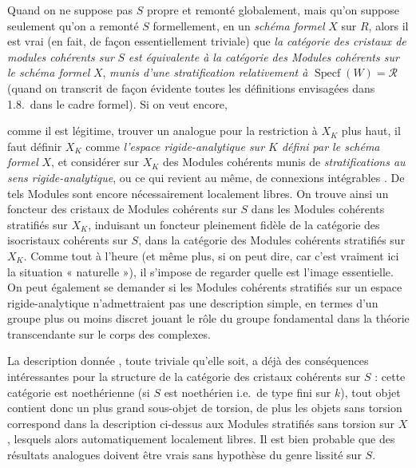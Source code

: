 \documentclass[11pt,a4paper]{article}
\begin{document}
Quand on ne suppose pas $S$  propre et remonté globalement,
mais qu'on suppose seulement qu'on a remonté $S$ formellement, en un
\emph{schéma formel} $X$ sur $R$, alors il est vrai (en fait, de façon
essentiellement triviale) que \emph{la catégorie des cristaux de modules
cohérents sur} $S$ \emph{est équivalente à la catégorie des Modules cohérents
sur le schéma formel} $X$, \emph{munis d'une stratification relativement à}
$\operatorname{Specf}(W)=\mathcal{R}$ (quand on transcrit de façon évidente
toutes les définitions envisagées dans 1.8.\ dans le cadre formel). Si on veut encore,

comme il est légitime, trouver un analogue pour la restriction à $X_K$
 plus haut, il faut définir $X_K$ comme \emph{l'espace
rigide-analytique sur $K$ défini par le schéma formel} $X$, et considérer sur
$X_K$ des Modules cohérents munis de  \emph{stratifications
au sens rigide-analytique}, ou ce qui revient au même, de connexions
intégrables . De tels Modules sont encore nécessairement
localement libres. On trouve ainsi un foncteur des
cristaux de Modules cohérents sur $S$ dans les Modules cohérents stratifiés sur
$X_K$, induisant un foncteur pleinement fidèle de la catégorie des isocristaux
cohérents sur $S$, dans la catégorie des Modules cohérents stratifiés sur
$X_K$. Comme tout à l'heure (et même plus, si on peut dire, car c'est vraiment
ici la situation « naturelle »), il s'impose de regarder quelle est l'image
essentielle. On peut également se demander si les Modules cohérents stratifiés
sur un espace rigide-analytique n'admettraient pas une description simple, en
termes d'un groupe plus ou moins discret jouant le rôle du groupe fondamental
dans la théorie transcendante sur le corps des complexes.

La description donnée , toute triviale qu'elle soit,
a déjà des conséquences intéressantes pour la structure de la catégorie des
cristaux  cohérents sur $S$ : cette catégorie est
noethérienne (si $S$ est noethérien i.e.\ de type fini sur $k$), tout objet
contient donc un plus grand sous-objet de torsion, de plus les objets sans
torsion correspond dans la description ci-dessus aux Modules
stratifiés sans torsion sur $X$, lesquels  alors automatiquement
localement libres. Il est bien probable que des résultats analogues doivent
être vrais\add{,} sans hypothèse du genre lissité sur $S$.
\end{document}
